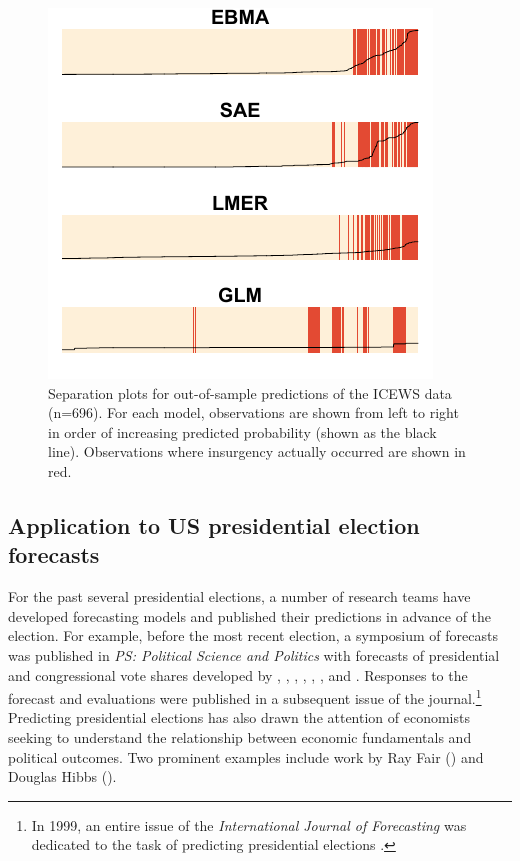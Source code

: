 \documentclass[pdftex,12pt,fullpage,oneside]{amsart}
\begin{document}
\begin{figure}
\caption{\footnotesize Separation plots for out-of-sample predictions of the ICEWS
  data (n=696).  For each model,
  observations are shown from left to right in order of increasing
  predicted probability (shown as the black line).  Observations where
insurgency actually occurred are shown in red.}
\label{OutSam1sep}
\begin{center}
\includegraphics[]{OutSampleNew.pdf}
\end{center}
\end{figure}



\subsection{Application to US presidential election forecasts}
For the past several presidential elections, a number of research
teams have developed forecasting models and published their
predictions in advance of the election.  For example, before the most
recent election, a symposium of forecasts was published in \emph{PS:
  Political Science and Politics} with forecasts of presidential and
congressional vote shares developed by \citet{Campbell:2008},
\citet{Norpoth:2008}, \citet{Lewis-Beck:Tien:2008},
\citet{Abramowitz:2008}, \citet{Erikson:Wlezien:2008},
\citet{Holbrook:2008}, \citet{Lockerbie:2008} and
\citet{Cuzan:Bundrick:2008}.  Responses to the forecast and
evaluations were published in a subsequent issue of the
journal.\footnote{In 1999, an entire issue of the
  \textit{International Journal of Forecasting} was dedicated to the
  task of predicting presidential elections \citep{Brown:1999}.}
Predicting presidential elections has also drawn the attention of
economists seeking to understand the relationship between economic
fundamentals and political outcomes.  Two prominent examples include
work by Ray Fair (\citeyear{Fair:2010}) and Douglas Hibbs
(\citeyear{Hibbs:2000}).
\end{document}
